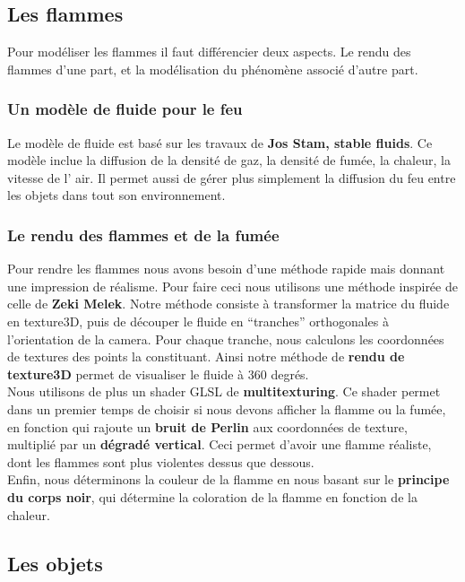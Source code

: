 \documentclass[a4paper,10pt]{article}
\begin{document}
\subsection{Les flammes}
Pour modéliser les flammes il faut différencier deux aspects. Le rendu
des flammes d'une part, et la modélisation du phénomène associé
d'autre part.

\subsubsection{Un modèle de fluide pour le feu}
Le modèle de fluide est basé sur les travaux de \textbf{Jos Stam, stable fluids}. 
Ce modèle inclue la diffusion de la densité de gaz, la densité de fumée, la chaleur, 
la vitesse de l' air. Il permet aussi de gérer plus
simplement la diffusion du feu entre les objets dans tout son environnement.

\subsubsection{Le rendu des flammes et de la fumée}
Pour rendre les flammes nous avons besoin d'une méthode rapide mais
donnant une impression de réalisme. Pour faire ceci nous utilisons une
méthode inspirée de celle de \textbf{Zeki Melek}. Notre méthode consiste à
transformer la matrice du fluide en texture3D, puis de découper le fluide en 
``tranches'' orthogonales à l'orientation de la camera. Pour chaque tranche,
nous calculons les coordonnées de textures des points la constituant. 
Ainsi notre méthode de \textbf{rendu de texture3D} permet de visualiser le fluide
à 360 degrés.\\
Nous utilisons de plus un shader GLSL de \textbf{multitexturing}. Ce shader
permet dans un premier temps de choisir si nous devons afficher la flamme ou la
fumée, en fonction qui rajoute un \textbf{bruit de Perlin}
aux coordonnées de texture, multiplié par un \textbf{dégradé vertical}. Ceci
permet d'avoir une flamme réaliste, dont les flammes sont plus violentes
dessus que dessous.\\
Enfin, nous déterminons la couleur de la flamme en nous basant sur le
\textbf{principe du corps noir}, qui détermine la coloration de la flamme
en fonction de la chaleur.

\subsection{Les objets}
\end{document}
